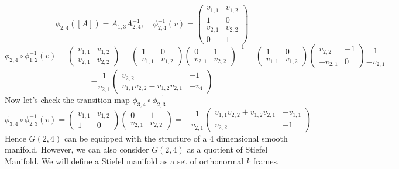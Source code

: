 \documentclass[11pt,a4paper]{report}
\begin{document}
$$ \phi_{2,4}([A]) = A_{1,3} A_{2,4}^{-1}, \quad \phi_{2,4}^{-1}(v) = 
\begin{pmatrix}
v_{1,1} & v_{1,2} \\
1 & 0 \\
v_{2,1} & v_{2,2} \\
0 & 1
\end{pmatrix}
$$
$$ \phi_{2,4} \circ \phi_{1,2}^{-1}(v) = 
\begin{pmatrix}
v_{1,1} & v_{1,2} \\
v_{2,1} & v_{2,2}
\end{pmatrix} =
\begin{pmatrix}
    1 & 0 \\
    v_{1,1} & v_{1,2}
\end{pmatrix}
\begin{pmatrix}
    0 & 1 \\
    v_{2,1} & v_{2,2}
\end{pmatrix} ^{-1}
= 
\begin{pmatrix}
    1 & 0 \\
    v_{1,1} & v_{1,2}
\end{pmatrix}
\begin{pmatrix}
    v_{2,2} & -1 \\
    -v_{2,1} & 0
\end{pmatrix} \frac{1}{-v_{2,1}} = 
$$
$$ -\frac{1}{v_{2,1}} \begin{pmatrix} v_{2,2} & -1 \\ v_{1,1} v_{2,2} - v_{1,2} v_{2,1} & -v_{4} \end{pmatrix}
$$
\newline
Now let's check the transition map $ \phi_{3,4} \circ \phi_{2,3}^{-1} $ 
$$ \phi_{3,4} \circ \phi_{2,3}^{-1} (v) =
\begin{pmatrix} v_{1,1} &  v_{1,2} \\ 1 & 0 \end{pmatrix} 
\begin{pmatrix} 0 & 1 \\ v_{2,1} & v_{2,2} \end{pmatrix} = 
-\frac{1}{v_{2,1}} \begin{pmatrix} v_{1,1} v_{2,2} + v_{1,2} v_{2,1} & -v_{1,1} \\ v_{2,2} & -1 \end{pmatrix}
$$ 
Hence $G(2,4)$ can be equipped with the structure of a 4 dimensional smooth manifold.
\newline
However, we can also consider $G(2,4)$ as a quotient of Stiefel Manifold.
We will define a Stiefel manifold as a set of orthonormal $k$ frames. 
\end{document}
